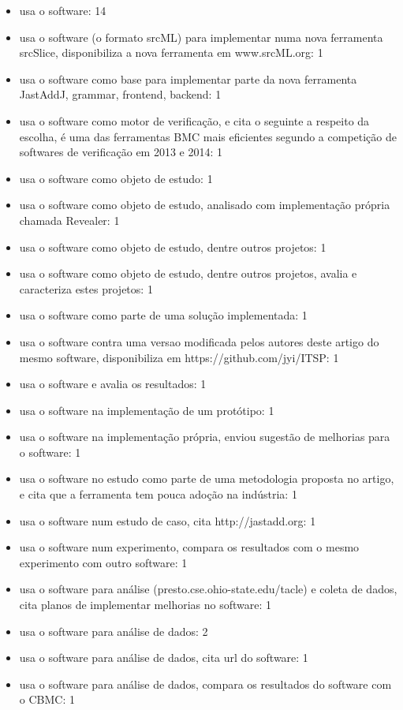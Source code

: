 \begin{itemize}
\item usa o software: 14
\item usa o software (o formato srcML) para implementar numa nova ferramenta srcSlice, disponibiliza a nova ferramenta em www.srcML.org: 1
\item usa o software como base para implementar parte da nova ferramenta JastAddJ, grammar, frontend, backend: 1
\item usa o software como motor de verificação, e cita o seguinte a respeito da escolha, é uma das ferramentas BMC mais eficientes segundo a competição de softwares de verificação em 2013 e 2014: 1
\item usa o software como objeto de estudo: 1
\item usa o software como objeto de estudo, analisado com implementação própria chamada Revealer: 1
\item usa o software como objeto de estudo, dentre outros projetos: 1
\item usa o software como objeto de estudo, dentre outros projetos, avalia e caracteriza estes projetos: 1
\item usa o software como parte de uma solução implementada: 1
\item usa o software contra uma versao modificada pelos autores deste artigo do mesmo software, disponibiliza em https://github.com/jyi/ITSP: 1
\item usa o software e avalia os resultados: 1
\item usa o software na implementação de um protótipo: 1
\item usa o software na implementação própria, enviou sugestão de melhorias para o software: 1
\item usa o software no estudo como parte de uma metodologia proposta no artigo, e cita que a ferramenta tem pouca adoção na indústria: 1
\item usa o software num estudo de caso, cita http://jastadd.org: 1
\item usa o software num experimento, compara os resultados com o mesmo experimento com outro software: 1
\item usa o software para análise (presto.cse.ohio-state.edu/tacle) e coleta de dados, cita planos de implementar melhorias no software: 1
\item usa o software para análise de dados: 2
\item usa o software para análise de dados, cita url do software: 1
\item usa o software para análise de dados, compara os resultados do software com o CBMC: 1

\end{itemize}
